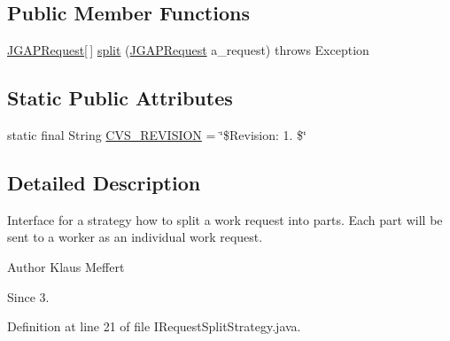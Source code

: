 \subsection*{Public Member Functions}
\begin{DoxyCompactItemize}
\item 
\hyperlink{classorg_1_1jgap_1_1distr_1_1grid_1_1_j_g_a_p_request}{J\-G\-A\-P\-Request}\mbox{[}$\,$\mbox{]} \hyperlink{interfaceorg_1_1jgap_1_1distr_1_1grid_1_1_i_request_split_strategy_ae43619a42994ddfad41f8fc6513cf44c}{split} (\hyperlink{classorg_1_1jgap_1_1distr_1_1grid_1_1_j_g_a_p_request}{J\-G\-A\-P\-Request} a\-\_\-request)  throws Exception
\end{DoxyCompactItemize}
\subsection*{Static Public Attributes}
\begin{DoxyCompactItemize}
\item 
static final String \hyperlink{interfaceorg_1_1jgap_1_1distr_1_1grid_1_1_i_request_split_strategy_aef08b28ef1455714a55e1cdd37acca64}{C\-V\-S\-\_\-\-R\-E\-V\-I\-S\-I\-O\-N} = \char`\"{}\$Revision\-: 1. \$\char`\"{}
\end{DoxyCompactItemize}


\subsection{Detailed Description}
Interface for a strategy how to split a work request into parts. Each part will be sent to a worker as an individual work request.

\begin{DoxyAuthor}{Author}
Klaus Meffert 
\end{DoxyAuthor}
\begin{DoxySince}{Since}
3. 
\end{DoxySince}


Definition at line 21 of file I\-Request\-Split\-Strategy.\-java.



